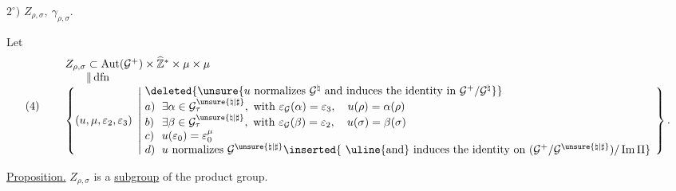 

$2^\circ)$ \quad $Z_{\rho,\sigma},\ \gamma_{\rho,\sigma}$.

Let
\[
\arraycolsep=3pt (4)\qquad
\begin{array}{l}
 Z_{\rho,\sigma}\subset
 \operatorname{Aut}(\mathcal{G}^{+})\times
 \widehat{\mathbb{Z}}^{*}\times\mu\times\mu\\
 \phantom{Z_{\rho,\sigma}}\Vert\,\mathrm{dfn}\\
 \left\{(u,\mu,\varepsilon_2,\varepsilon_3)\ \left|
 \begin{array}{ll}
 \multicolumn{2}{l}{\deleted{\unsure{u\ \text{normalizes}\ \mathcal{G}^{\natural}\ 
 \text{and induces the identity in}\ \mathcal{G}^{+}/\mathcal{G}^{\natural}}}}\\
 a)&\exists\alpha\in\mathcal{G}_{\tau}^{\unsure{\natural|\sharp}},
 \ \text{with }\varepsilon_{\mathcal{G}}(\alpha)=\varepsilon_3,
 \quad u(\rho)=\alpha(\rho)\\
 b)&\exists\beta\in\mathcal{G}_{\tau}^{\unsure{\natural|\sharp}},
 \ \text{with }\varepsilon_{\mathcal{G}}(\beta)=\varepsilon_2,
 \quad u(\sigma)=\beta(\sigma)\\
 c)&u(\varepsilon_0)=\varepsilon_0^\mu\\
 d)&u\ \text{normalizes }\mathcal{G}^{\unsure{\natural|\sharp}}
 \inserted{\ \text{\uline{and} induces the identity on }
 (\mathcal{G}^{+}/\mathcal{G}^{\unsure{\natural|\sharp}})/\operatorname{Im}\Pi}
 \end{array}\right.\right\}.
\end{array}
\]

\uline{Proposition.} \quad $Z_{\rho,\sigma}$ is a \uline{subgroup}
of the product group.

